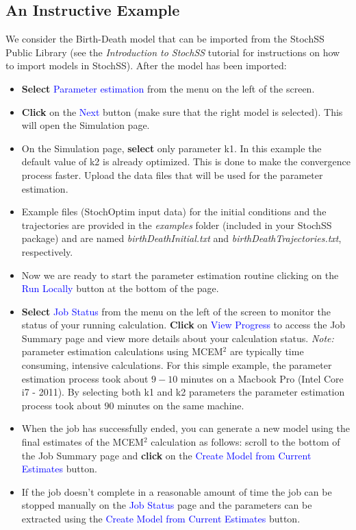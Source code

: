 \subsection{An Instructive Example}
We consider the Birth-Death model that can be imported from the StochSS Public Library (see the \textit{Introduction to StochSS} tutorial for instructions on how to import models in StochSS).
After the model has been imported:
\begin{itemize}
\item \textbf{Select} \textcolor{blue}{Parameter estimation} from the menu on the left of the screen.
\item \textbf{Click} on the \textcolor{blue}{Next} button (make sure that the right model is selected). This will open the Simulation page.
\item On the Simulation page, \textbf{select} only parameter k1. In this example the default value of k2 is already optimized. This is done to make the convergence process faster. Upload the data files that will be used for the parameter estimation.
\item Example files (StochOptim input data) for the initial conditions and the trajectories are provided in the \textit{examples} folder (included in your StochSS package) and are named \textit{birthDeathInitial.txt} and \textit{birthDeathTrajectories.txt}, respectively.
\item Now we are ready to start the parameter estimation routine clicking on the \textcolor{blue}{Run Locally} button at the bottom of the page. 
\item \textbf{Select} \textcolor{blue}{Job Status} from the menu on the left of the screen to monitor the status of your running calculation.
\textbf{Click} on  \textcolor{blue}{View Progress} to access the Job Summary page and view more details about your calculation status. \textit{Note:} parameter estimation calculations using MCEM$^2$ are typically time consuming, intensive calculations. For this simple example, the parameter estimation process took about $9-10$ minutes on a Macbook Pro (Intel Core i7 - 2011). By selecting both k1 and k2 parameters the parameter estimation process took about $90$ minutes on the same machine.

\item When the job has successfully ended, you can generate a new model using the final estimates of the MCEM$^2$ calculation as follows: scroll to the bottom of the Job Summary page and \textbf{click} on the \textcolor{blue}{Create Model from Current Estimates} button. 
\item If the job doesn't complete in a reasonable amount of time the job can be stopped manually on the \textcolor{blue}{Job Status} page and the parameters can be extracted using the \textcolor{blue}{Create Model from Current Estimates} button.
\end{itemize}


